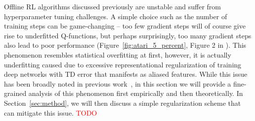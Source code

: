 Offline RL algorithms discussed previously are unstable and suffer from hyperparameter tuning challenges. A simple choice such as the number of training steps can be game-changing -- too few gradient steps will of course give rise to underfitted Q-functions, but perhaps surprisingly, too many gradient steps also lead to poor performance (Figure~\ref{fig:atari_5_percent}, Figure 2 in \citep{kumar2021implicit}). This phenomenon resembles statistical overfitting at first, however, it is actually underfitting caused due to excessive representational regularization of training deep networks with TD error that manifests as aliased features. While this issue has been broadly noted in previous work~\citep{kumar2021implicit}, in this section we will provide a fine-grained analysis of this phenomenon first empirically and then theoretically. In Section~\ref{sec:method}, we will then discuss a simple regularization scheme that can mitigate this issue. \textcolor{red}{TODO}  

